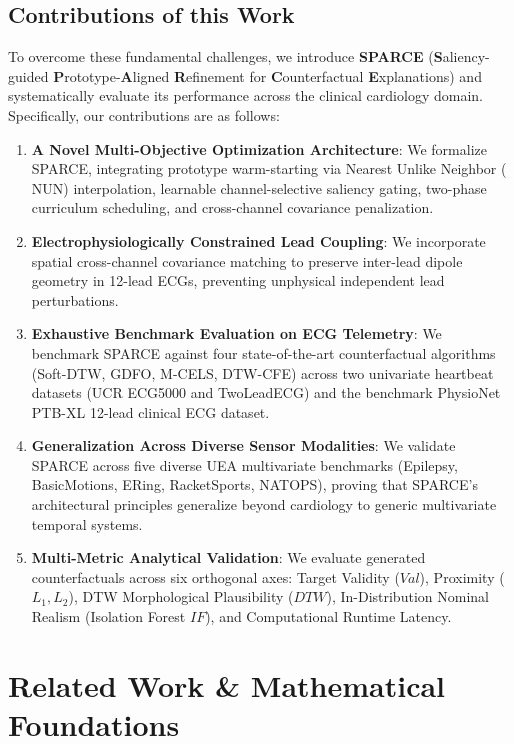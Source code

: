 \documentclass[conference]{IEEEtran}
\begin{document}
\subsection{Contributions of this Work}
To overcome these fundamental challenges, we introduce \textbf{SPARCE} (\textbf{S}aliency-guided \textbf{P}rototype-\textbf{A}ligned \textbf{R}efinement for \textbf{C}ounterfactual \textbf{E}xplanations) and systematically evaluate its performance across the clinical cardiology domain. Specifically, our contributions are as follows:
\begin{enumerate}
    \item \textbf{A Novel Multi-Objective Optimization Architecture}: We formalize SPARCE, integrating prototype warm-starting via Nearest Unlike Neighbor ($\text{NUN}$) interpolation, learnable channel-selective saliency gating, two-phase curriculum scheduling, and cross-channel covariance penalization.
    \item \textbf{Electrophysiologically Constrained Lead Coupling}: We incorporate spatial cross-channel covariance matching to preserve inter-lead dipole geometry in 12-lead ECGs, preventing unphysical independent lead perturbations.
    \item \textbf{Exhaustive Benchmark Evaluation on ECG Telemetry}: We benchmark SPARCE against four state-of-the-art counterfactual algorithms (Soft-DTW, GDFO, M-CELS, DTW-CFE) across two univariate heartbeat datasets (UCR ECG5000 and TwoLeadECG) and the benchmark PhysioNet PTB-XL 12-lead clinical ECG dataset.
    \item \textbf{Generalization Across Diverse Sensor Modalities}: We validate SPARCE across five diverse UEA multivariate benchmarks (Epilepsy, BasicMotions, ERing, RacketSports, NATOPS), proving that SPARCE's architectural principles generalize beyond cardiology to generic multivariate temporal systems.
    \item \textbf{Multi-Metric Analytical Validation}: We evaluate generated counterfactuals across six orthogonal axes: Target Validity ($Val$), Proximity ($L_1, L_2$), DTW Morphological Plausibility ($DTW$), In-Distribution Nominal Realism (Isolation Forest $IF$), and Computational Runtime Latency.
\end{enumerate}

\section{Related Work \& Mathematical Foundations}
\end{document}
